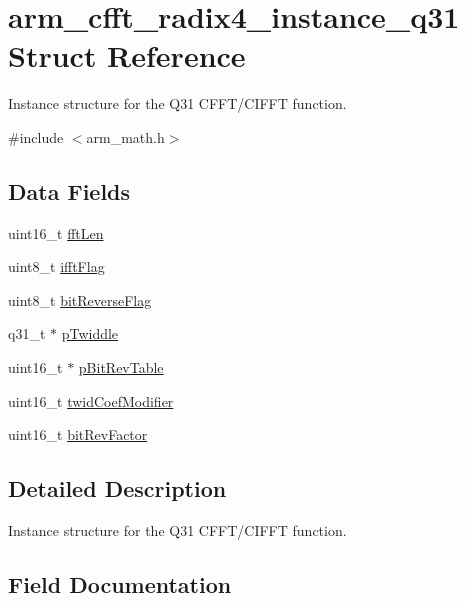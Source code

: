 \hypertarget{structarm__cfft__radix4__instance__q31}{}\section{arm\+\_\+cfft\+\_\+radix4\+\_\+instance\+\_\+q31 Struct Reference}
\label{structarm__cfft__radix4__instance__q31}


Instance structure for the Q31 C\+F\+F\+T/\+C\+I\+F\+FT function.  




{\ttfamily \#include $<$arm\+\_\+math.\+h$>$}

\subsection*{Data Fields}
\begin{DoxyCompactItemize}
\item 
uint16\+\_\+t \hyperlink{structarm__cfft__radix4__instance__q31_ab8db3bbe7c61e6bb8ca2a55e3446e11a}{fft\+Len}
\item 
uint8\+\_\+t \hyperlink{structarm__cfft__radix4__instance__q31_ad6ca6e223f986ebfd94c5ee1e410aa73}{ifft\+Flag}
\item 
uint8\+\_\+t \hyperlink{structarm__cfft__radix4__instance__q31_a09a221a818c6d0e064557a99e2fe9a8b}{bit\+Reverse\+Flag}
\item 
q31\+\_\+t $\ast$ \hyperlink{structarm__cfft__radix4__instance__q31_a2505b7d5ec077b244c712797a5253b6d}{p\+Twiddle}
\item 
uint16\+\_\+t $\ast$ \hyperlink{structarm__cfft__radix4__instance__q31_a46a2fb328199897af100fea0bfdf59aa}{p\+Bit\+Rev\+Table}
\item 
uint16\+\_\+t \hyperlink{structarm__cfft__radix4__instance__q31_afe772e5b5001c9d8e85032115a8df5bf}{twid\+Coef\+Modifier}
\item 
uint16\+\_\+t \hyperlink{structarm__cfft__radix4__instance__q31_a33386d95319dc3ee7097b3a8e52e01ec}{bit\+Rev\+Factor}
\end{DoxyCompactItemize}


\subsection{Detailed Description}
Instance structure for the Q31 C\+F\+F\+T/\+C\+I\+F\+FT function. 

\subsection{Field Documentation}
\mbox{\label{structarm__cfft__radix4__instance__q31_a09a221a818c6d0e064557a99e2fe9a8b}} 
